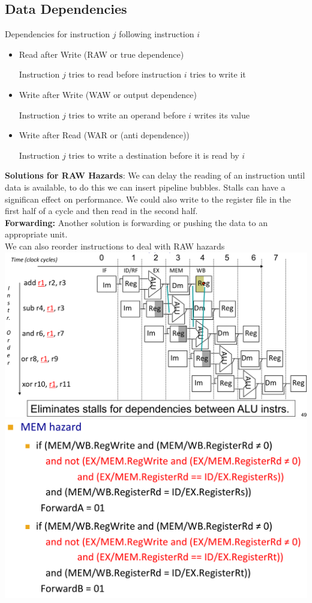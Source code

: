 \subsection*{Data Dependencies}
Dependencies for instruction $j$ following instruction $i$
\begin{itemize}
\item Read after Write (RAW or true dependence)
	\par Instruction $j$ tries to read before instruction $i$ tries to write it
\item Write after Write (WAW or output dependence)
	\par Instruction $j$ tries to write an operand before $i$ writes its value
\item Write after Read (WAR or (anti dependence))
	\par Instruction $j$ tries to write a destination before it is read by $i$
\end{itemize}
\textbf{Solutions for RAW Hazards}: We can delay the reading of an instruction
until data is available, to do this we can insert pipeline bubbles. Stalls can
have a significan effect on performance. We could also write to the register
file in the first half of a cycle and then read in the second half.\\
\textbf{Forwarding:} Another solution is forwarding or pushing the data to an
appropriate unit. \\
We can also reorder instructions to deal with RAW hazards\\
\includegraphics[width=\linewidth]{png/forwarding.png}
\includegraphics[width=\linewidth]{png/forwardingcontrol.png}
